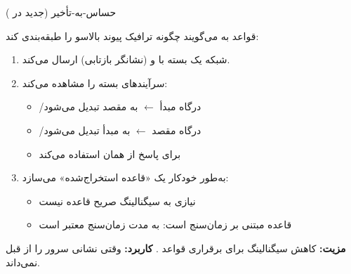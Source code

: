 \begin{CNquote}

 حساس-به-تأخیر (جدید در )

\end{CNquote}



قواعد  به  می‌گویند چگونه ترافیک پیوند بالاسو را طبقه‌بندی کند:



\begin{enumerate}
\def\labelenumi{\arabic{enumi}.}
\tightlist
\item
  شبکه یک بسته  با  و  (نشانگر  بازتابی) ارسال می‌کند.
\item
   سرآیندهای بسته  را مشاهده می‌کند:

  \begin{itemize}
  \tightlist
  \item
    /\allowbreak{}درگاه مبدأ \ensuremath{\leftarrow} به مقصد  تبدیل می‌شود
  \item
    /\allowbreak{}درگاه مقصد \ensuremath{\leftarrow} به مبدأ  تبدیل می‌شود
  \item
     برای پاسخ از همان  استفاده می‌کند
  \end{itemize}
\item
   به‌طور خودکار یک «قاعده  استخراج‌شده» می‌سازد:

  \begin{itemize}
  \tightlist
  \item
    نیازی به سیگنالینگ صریح قاعده  نیست
  \item
    قاعده مبتنی بر زمان‌سنج است: به مدت زمان‌سنج  معتبر است
  \end{itemize}
\end{enumerate}

\textbf{مزیت:} کاهش سیگنالینگ برای برقراری قواعد . \textbf{کاربرد:} وقتی  نشانی  سرور را از قبل نمی‌داند.


